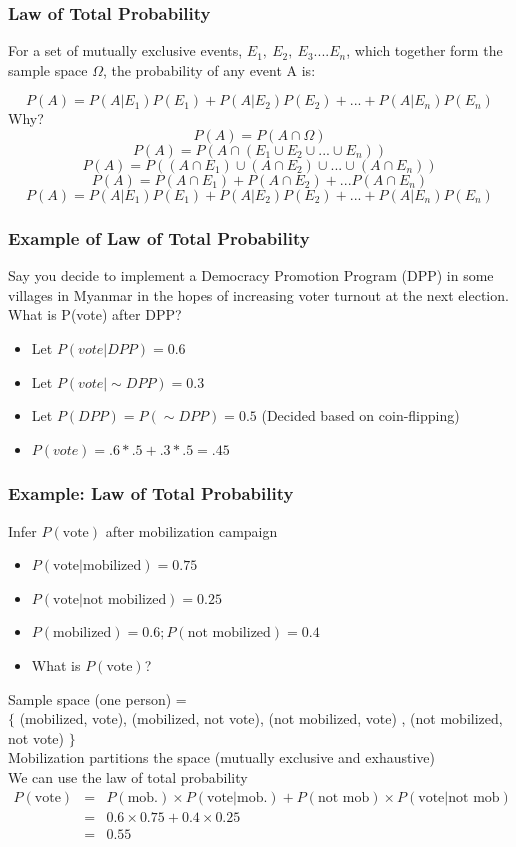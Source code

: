 \documentclass[handout]{beamer}
\numberwithin{equation}{section}
\begin{document}
\begin{frame}
\frametitle{Law of Total Probability}

For a set of mutually exclusive events, $E_1,\  E_2,\ E_3 .... E_n$, which together form the sample space $\Omega$, the probability of any event A is:

$$P(A)= P(A|E_1)P(E_1)+P(A|E_2)P(E_2)+...+P(A|E_n)P(E_n)$$
\pause Why?\pause
$$P(A)= P(A\cap \Omega)$$\pause
$$P(A)= P(A\cap (E_1\cup E_2 \cup ... \cup E_n))$$\pause
$$P(A)= P((A\cap E_1)\cup (A\cap E_2) \cup ... \cup(A\cap E_n))$$\pause
$$P(A)= P(A\cap E_1)+ P(A\cap E_2) + ...P(A\cap E_n)$$\pause
$$P(A)= P(A|E_1)P(E_1)+P(A|E_2)P(E_2)+...+P(A|E_n)P(E_n)$$

\end{frame}


\begin{frame}
\frametitle{Example of Law of Total Probability}
 Say you decide to implement a Democracy Promotion Program (DPP) in some villages in Myanmar in the hopes of increasing voter turnout at the next election. What is P(vote) after DPP?\pause
 \begin{itemize}
 \item Let $P(vote|DPP)=0.6$\pause
 \item Let $P(vote|\sim DPP)=0.3$\pause
 \item Let $P(DPP) = P(\sim DPP) = 0.5$ (Decided based on coin-flipping)\pause
 \item $P(vote)= .6*.5+.3*.5= .45$
 \end{itemize}
\end{frame}


\begin{frame}
\frametitle{Example: Law of Total Probability} 

Infer $P(\text{vote})$ after mobilization campaign \pause 
\begin{itemize}
\item[-] $P(\text{vote}|\text{mobilized} ) = 0.75$ \pause 
\item[-] $P(\text{vote}| \text{not mobilized} ) = 0.25 $ \pause 
\item[-] $P(\text{mobilized}) = 0.6 ; P(\text{not mobilized} ) = 0.4 $ \pause 
\item[-] What is $P(\text{vote})$? \pause 
\end{itemize}

Sample space (one person) = \\$\{$ (mobilized, vote), (mobilized, not vote), (not mobilized, vote) , (not mobilized, not vote) $\}$\\
\alert{Mobilization} partitions the space (mutually exclusive and exhaustive)  \pause \\
We can use the law of total probability \pause 
\begin{eqnarray}
P(\text{vote} ) & = & P(\text{mob.} ) \times P(\text{vote}| \text{mob.} ) + P(\text{not mob}) \times P(\text{vote} | \text{not mob} ) \nonumber \\
 & = & 0.6 \times 0.75 + 0.4 \times 0.25 \nonumber \\
  & = & 0.55 \nonumber  
  \end{eqnarray}

\end{frame}
\end{document}
